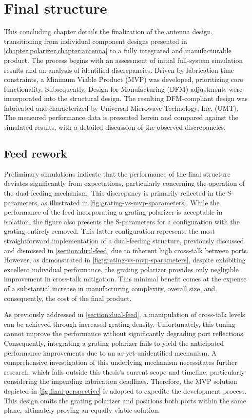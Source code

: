 \documentclass[11pt,a4paper,twoside,openany]{report}
\begin{document}
\chapter{Final structure}
\label{chapter:final-structure}
This concluding chapter details the finalization of the antenna design, transitioning from individual component designs presented in \cref{chapter:polarizer,chapter:antenna} to a fully integrated and manufacturable product. The process begins with an assessment of initial full-system simulation results and an analysis of identified discrepancies. Driven by fabrication time constraints, a Minimum Viable Product (MVP) was developed, prioritizing core functionality. Subsequently, Design for Manufacturing (DFM) adjustments were incorporated into the structural design. The resulting DFM-compliant design was fabricated and characterized by Universal Microwave Technology, Inc, (UMT). The measured performance data is presented herein and compared against the simulated results, with a detailed discussion of the observed discrepancies.

\section{Feed rework}
Preliminary simulations indicate that the performance of the final structure deviates significantly from expectations, particularly concerning the operation of the dual-feeding mechanism. This discrepancy is primarily reflected in the S-parameters, as illustrated in \cref{fig:grating-vs-mvp-sparameters}. While the performance of the feed incorporating a grating polarizer is acceptable in isolation, the figure also presents the S-parameters for a configuration with the grating entirely removed. This latter configuration represents the most straightforward implementation of a dual-feeding structure, previously discussed and dismissed in \cref{section:dual-feed} due to inherent high cross-talk between ports. However, as demonstrated in \cref{fig:grating-vs-mvp-sparameters}, despite exhibiting excellent individual performance, the grating polarizer provides only negligible improvement in cross-talk mitigation. This minimal benefit comes at the expense of a substantial increase in manufacturing complexity, overall size, and, consequently, the cost of the final product.

As previously addressed in \cref{section:dual-feed}, a manipulation of cross-talk levels can be achieved through increased grating density. Unfortunately, this tuning cannot improve the performance without significantly degrading port reflections. Consequently, integrating a grating polarizer fails to yield the anticipated performance improvements due to an as-yet-unidentified mechanism. A comprehensive investigation of this underlying mechanism necessitates further research, which falls outside this thesis's current scope and timeline, particularly considering the impending fabrication deadlines. Therefore, the MVP solution depicted in \cref{fig:final-perspective} is adopted to expedite the development process. This design omits the grating polarizer and positions both ports within the same plane, ultimately proving an equally viable solution.
\end{document}
